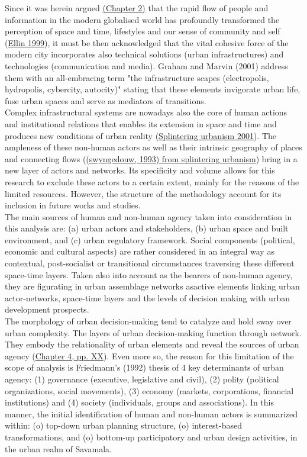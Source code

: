\documentclass[11pt]{report}
\begin{document}
Since it was herein argued \href{}{(Chapter 2)} that the rapid flow of people and information in the modern globalised world has profoundly transformed the perception of space and time, lifestyles and our sense of community and self (\href{}{Ellin 1999}), it must be then acknowledged that the vital cohesive force of the modern city incorporates also technical solutions (urban infrastructures) and technologies (communication and media).
Graham and Marvin (2001) address them with an  all-embracing term "the infrastructure scapes (electropolis, hydropolis, cybercity, autocity)" stating that these elements invigorate urban life, fuse urban spaces and serve as mediators of transitions.
\\

Complex infrastructural systems are nowadays also the core of human actions and institutional relations that enables its extension in space and time and produces new conditions of urban reality (\href{}{Splintering urbanism 2001}).
The ampleness of these non-human actors as well as their intrinsic geography of places and connecting flows (\href{}{(swyngedouw, 1993) from splintering urbanism}) bring in a new layer of actors and networks.
Its specificity and volume allows for this research to exclude these actors to a certain extent, mainly for the reasons of the limited resources. 
However, the structure of the methodology account for its inclusion in future works and studies. 
\\

The main sources of human and non-human agency taken into consideration in this analysis are: (a) urban actors and stakeholders, (b) urban space and built environment, and (c) urban regulatory framework.
Social components (political, economic and cultural aspects) are rather considered in an integral way as contextual, post-socialist or transitional circumstances traversing these different space-time layers.
Taken also into account as the bearers of non-human agency, they are figurating in urban assemblage networks asactive elements linking urban actor-networks, space-time layers and the levels of decision making with urban development prospects.
\\

The morphology of urban decision-making tend to catalyze and hold sway over urban complexity.
The layers of urban decision-making function through network. They embody the relationality of urban elements and reveal the sources of urban agency (\href{}{Chapter 4, pp. XX}).
Even more so, the reason for this limitation of the scope of analysis is Friedmann's (1992) thesis of 4 key determinants of urban agency:
(1) governance (executive, legislative and civil),
(2) polity (political organizations, social movements),
(3) economy (markets, corporations, financial institutions) and
(4) society (individuals, groups and associations).
In this manner, the initial identification of human and non-human actors is summarized within:
(o) top-down urban planning structure,
(o) interest-based transformations,
and
(o) bottom-up participatory and urban design activities, in the urban realm of Savamala.
\end{document}
